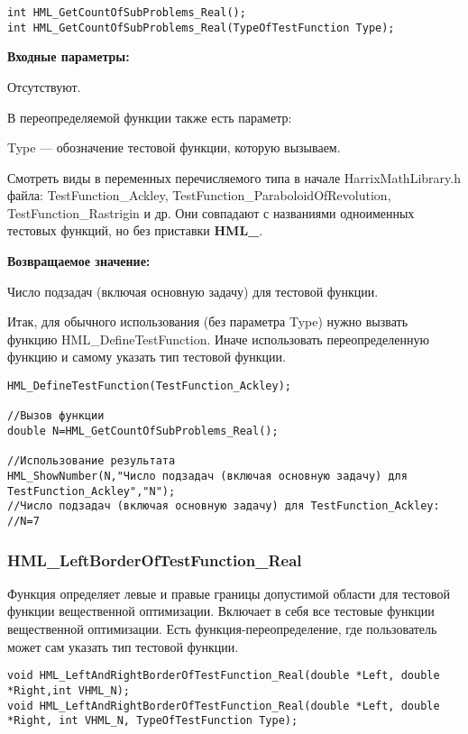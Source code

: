 \documentclass[a4paper,12pt]{article}
\begin{document}
\begin{lstlisting}[label=code_syntax_HML_GetCountOfSubProblems_Real,caption=Синтаксис]
int HML_GetCountOfSubProblems_Real();
int HML_GetCountOfSubProblems_Real(TypeOfTestFunction Type);
\end{lstlisting}

\textbf{Входные параметры:}

Отсутствуют.

В переопределяемой функции также есть параметр:
  
Type --- обозначение тестовой функции, которую вызываем. 

Смотреть виды в переменных перечисляемого типа в начале HarrixMathLibrary.h файла: TestFunction\_Ackley, TestFunction\_ParaboloidOfRevolution, TestFunction\_Rastrigin и др. Они совпадают с названиями одноименных тестовых функций, но без приставки \textbf{HML\_}.

\textbf{Возвращаемое значение:}
 
Число подзадач (включая основную задачу) для тестовой функции.

Итак, для обычного использования (без параметра Type) нужно вызвать функцию HML\_DefineTestFunction. Иначе использовать переопределенную функцию и самому указать тип тестовой функции.


\begin{lstlisting}[label=code_use_HML_GetCountOfSubProblems_Real,caption=Пример использования]
HML_DefineTestFunction(TestFunction_Ackley);

//Вызов функции
double N=HML_GetCountOfSubProblems_Real();

//Использование результата
HML_ShowNumber(N,"Число подзадач (включая основную задачу) для TestFunction_Ackley","N");
//Число подзадач (включая основную задачу) для TestFunction_Ackley:
//N=7
\end{lstlisting}

\subsubsection{HML\_LeftBorderOfTestFunction\_Real}\label{HML_LeftBorderOfTestFunction_Real}

Функция определяет левые и правые границы допустимой области для тестовой функции вещественной оптимизации. Включает в себя все тестовые функции вещественной оптимизации. Есть функция-переопределение, где пользователь может сам указать тип тестовой функции.


\begin{lstlisting}[label=code_syntax_HML_LeftBorderOfTestFunction_Real,caption=Синтаксис]
void HML_LeftAndRightBorderOfTestFunction_Real(double *Left, double *Right,int VHML_N);
void HML_LeftAndRightBorderOfTestFunction_Real(double *Left, double *Right, int VHML_N, TypeOfTestFunction Type);
\end{lstlisting}
\end{document}
